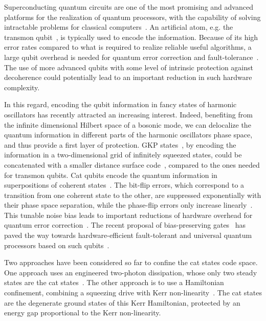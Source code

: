 \documentclass[%
 reprint,
 superscriptaddress,
 amsmath,
 amssymb,
 aps,
 pra,
 10pt
]{revtex4-2}
\begin{document}
Superconducting quantum circuits are one of the most promising and advanced platforms for the realization of quantum processors, with the capability of solving intractable problems for classical computers~\cite{Google_Supremacy}. An artificial atom, e.g. the transmon qubit~\cite{Koch2007}, is typically used to encode the information. Because of its high error rates compared to what is required to realize reliable useful algorithms, a large qubit overhead is needed for quantum error correction and fault-tolerance~\cite{Shor1996,Fowler2012}. The use of more advanced  qubits with some level of intrinsic protection against decoherence could potentially lead to an important reduction in such hardware complexity.

In this regard, encoding the qubit information in fancy states of harmonic oscillators has recently attracted an increasing interest. Indeed, benefiting from the infinite dimensional Hilbert space of  a bosonic mode, we can delocalize the quantum information in different parts of the harmonic oscillators phase space, and thus provide a first layer of protection. GKP states~\cite{Gottesman2001}, by encoding the information in a two-dimensional grid of infinitely squeezed states, could be concatenated with a smaller distance surface code~\cite{Fukui-PRL-2017,Fukui-PRX-2018,Vuillot-PRA-2019,Noh-PRA-2020}, compared to the ones needed for transmon qubits. Cat qubits encode the quantum information in superpositions of coherent states~\cite{Cochrane1999,Leghtas2013,Mirrahimi2014}. The bit-flip errors, which correspond to a transition from one coherent state to the other, are suppressed exponentially with their phase space separation, while the phase-flip errors only increase linearly~\cite{Lescanne2020}. This tunable noise bias leads to important reductions of hardware overhead for quantum error correction~\cite{Aliferis2008,tuckett2019tailoring,combes2022homodyne}. The recent proposal of bias-preserving gates~\cite{Guillaud2019,Puri2020} has paved the way towards hardware-efficient fault-tolerant and universal quantum processors based on such qubits~\cite{Guillaud2020,Chamberland2022,Darmawan2021}.

Two approaches have been considered so far to confine the cat states code space. One approach uses an engineered two-photon dissipation, whose only two steady states are the cat states~\cite{Mirrahimi2014,azouit2015convergence,Leghtas2015,Touzard2018,puri2019stabilized}. The other approach is to use a Hamiltonian confinement, combining a squeezing drive with Kerr non-linearity~\cite{Puri2017,Grimm2020,kwon2022autonomous,goto2019quantum,kanao2021high,goto2016universal,kanao2022quantum,chono2022two}. The cat states are the degenerate ground states of this Kerr Hamiltonian, protected by an energy gap proportional to the Kerr non-linearity.
\end{document}
